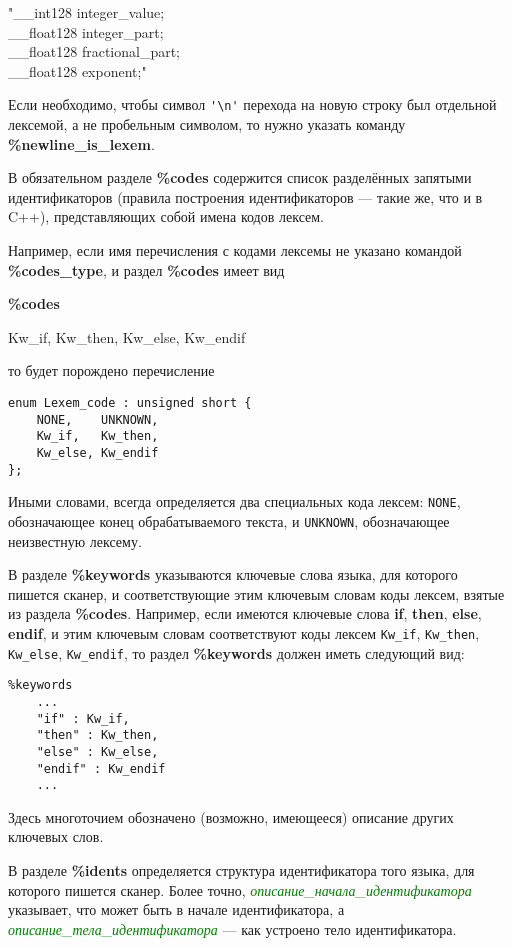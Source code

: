 \documentclass[10pt]{report}
\begin{document}
\noindent%
"__int128   integer_value;\\
__float128 integer_part;\\
__float128 fractional_part;\\
__float128 exponent;"

Если необходимо, чтобы символ \verb"'\n'" перехода на новую строку был отдельной лексемой, а не пробельным символом, то нужно указать команду 
\textbf{\%newline_is_lexem}.

В обязательном разделе  \textbf{\%codes} содержится список разделённых запятыми идентификаторов (правила построения идентификаторов --- такие же, что и в C++), представляющих 
собой имена кодов лексем. 

Например, если имя перечисления с кодами лексемы не указано командой \textbf{\%codes_type}, и раздел  \textbf{\%codes} имеет вид

\noindent%
\textbf{\%codes} 

Kw_if, Kw_then, Kw_else, Kw_endif

\noindent то будет порождено перечисление
\begin{verbatim}
enum Lexem_code : unsigned short {
    NONE,    UNKNOWN,
    Kw_if,   Kw_then, 
    Kw_else, Kw_endif
};
\end{verbatim}

Иными словами, всегда определяется два специальных кода лексем: \texttt{NONE}, обозначающее конец обрабатываемого текста, и \texttt{UNKNOWN}, обозначающее неизвестную лексему.

В разделе \textbf{\%keywords} указываются ключевые слова языка, для которого пишется сканер, и соответствующие этим ключевым словам коды лексем, взятые из
раздела \textbf{\%codes}. 
Например, если имеются ключевые слова \textbf{if}, \textbf{then}, \textbf{else}, \textbf{endif}, и этим ключевым словам соответствуют коды лексем
\texttt{Kw_if}, \texttt{Kw_then}, \texttt{Kw_else}, \texttt{Kw_endif}, то раздел \textbf{\%keywords} должен иметь следующий вид:
\begin{verbatim}
%keywords
    ...
    "if" : Kw_if,
    "then" : Kw_then,
    "else" : Kw_else,
    "endif" : Kw_endif
    ...
\end{verbatim}
Здесь многоточием обозначено (возможно, имеющееся) описание других ключевых слов.

В разделе \textbf{\%idents} определяется структура идентификатора того языка, для которого пишется сканер. Более точно, 
\textcolor{Green}{\textit{описание_начала_идентификатора}} указывает, что может быть в начале идентификатора, а \textcolor{Green}{\textit{описание_тела_идентификатора}} --- как
устроено тело идентификатора.
\end{document}
